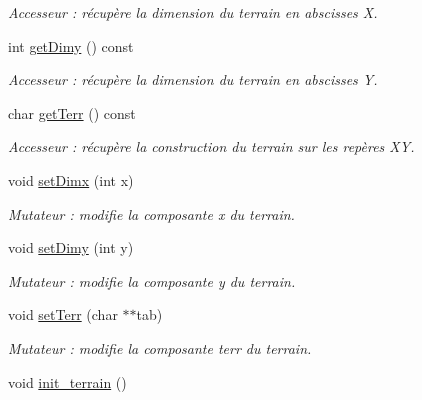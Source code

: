 \begin{DoxyCompactItemize}
\begin{DoxyCompactList}\small\item\em Accesseur \+: récupère la dimension du terrain en abscisses X. \end{DoxyCompactList}\item 
int \hyperlink{classTerrain_a79ca2b938f00bbacb972d9786317f185}{get\+Dimy} () const \hypertarget{classTerrain_a79ca2b938f00bbacb972d9786317f185}{}\label{classTerrain_a79ca2b938f00bbacb972d9786317f185}

\begin{DoxyCompactList}\small\item\em Accesseur \+: récupère la dimension du terrain en abscisses Y. \end{DoxyCompactList}\item 
char \hyperlink{classTerrain_a0fb16a05e3de6156d25327a6ea73209f}{get\+Terr} () const \hypertarget{classTerrain_a0fb16a05e3de6156d25327a6ea73209f}{}\label{classTerrain_a0fb16a05e3de6156d25327a6ea73209f}

\begin{DoxyCompactList}\small\item\em Accesseur \+: récupère la construction du terrain sur les repères XY. \end{DoxyCompactList}\item 
void \hyperlink{classTerrain_a433a2f713c6a55128f250f61c3d057ee}{set\+Dimx} (int x)
\begin{DoxyCompactList}\small\item\em Mutateur \+: modifie la composante x du terrain. \end{DoxyCompactList}\item 
void \hyperlink{classTerrain_a6ebb8d283986bd02aad7f254bc6eefae}{set\+Dimy} (int y)
\begin{DoxyCompactList}\small\item\em Mutateur \+: modifie la composante y du terrain. \end{DoxyCompactList}\item 
void \hyperlink{classTerrain_a8f1161c22d690102c833bd27bb3ea4d2}{set\+Terr} (char $\ast$$\ast$tab)
\begin{DoxyCompactList}\small\item\em Mutateur \+: modifie la composante terr du terrain. \end{DoxyCompactList}\item 
void \hyperlink{classTerrain_ac5237ac72c56a15d5020981d2679a855}{init\+\_\+terrain} ()\hypertarget{classTerrain_ac5237ac72c56a15d5020981d2679a855}{}\label{classTerrain_ac5237ac72c56a15d5020981d2679a855}


\end{DoxyCompactItemize}

